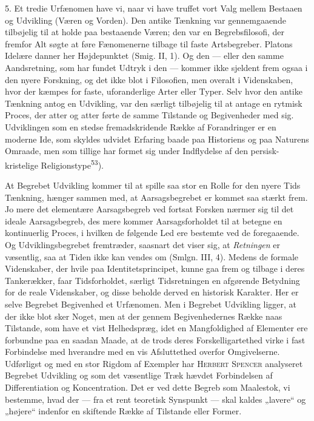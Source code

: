 \documentclass[12pt,a4paper,openany]{book}
\newcommand{\opage}[1]{\marginnote{\footnotesize\textit{[#1]}}}
\begin{document}
5. Et tredie Urfænomen have vi, naar vi have truffet vort Valg mellem Bestaaen
og Udvikling (Væren og Vorden). Den antike Tænkning var gennemgaaende
tilbøjelig til at holde paa bestaaende Væren; den var en Begrebsfilosofi, der
fremfor Alt søgte at føre Fænomenerne tilbage til faste Artsbegreber. Platons
Idelære danner her Højdepunktet (Smig. II, 1). Og den --- eller den samme
Aandsretning, som har fundet Udtryk i den --- kommer ikke sjeldent frem ogsaa i
den nyere Forskning, og det ikke blot i Filosofien, men overalt i Videnskaben,
hvor der kæmpes for faste, uforanderlige Arter eller Typer. Selv hvor den
antike Tænkning antog en Udvikling, var den særligt tilbøjelig til at antage en
rytmisk Proces, der atter og atter førte de samme Tilstande og Begivenheder med
sig. Udviklingen som en stedse fremadskridende Række af Forandringer er en
moderne Ide, som skyldes udvidet Erfaring baade paa Historiens
\opage{66}og paa Naturens Omraade, men som tillige har formet sig under
Indflydelse af den persisk-kristelige Religionstype\textsuperscript{53}).

At Begrebet Udvikling kommer til at spille saa stor en Rolle for den nyere Tids
Tænkning, hænger sammen med, at Aarsagsbegrebet er kommet saa stærkt frem. Jo
mere det elementære Aarsagsbegreb ved fortsat Forsken nærmer sig til det ideale
Aarsagsbegreb, des mere kommer Aarsagsforholdet til at betegne en kontinuerlig
Proces, i hvilken de følgende Led ere bestemte ved de foregaaende. Og
Udviklingsbegrebet fremtræder, saasnart det viser sig, at \textit{Retningen} er
væsentlig, saa at Tiden ikke kan vendes om (Smlgn. III, 4). Medens de formale
Videnskaber, der hvile paa Identitetsprincipet, kunne gaa frem og tilbage i
deres Tankerækker, faar Tidsforholdet, særligt Tidsretningen en afgørende
Betydning for de reale Videnskaber, og disse beholde derved en historisk
Karakter. Her er selve Begrebet Begivenhed et Urfænomen. Men i Begrebet
Udvikling ligger, at der ikke blot sker Noget, men at der gennem
Begivenhedernes Række naas Tilstande, som have et vist Helhedspræg, idet en
Mangfoldighed af Elementer ere forbundne paa en saadan Maade, at de trods deres
Forskelligartethed virke i fast Forbindelse med hverandre med en vis
Afsluttethed overfor Omgivelserne. Udførligst og med en stor Rigdom af Exempler
har \textsc{Herbert} \textsc{Spencer} analyseret Begrebet Udvikling og som det
væsentlige Træk hævdet Forbindelsen af Differentiation og Koncentration. Det er
ved dette Begreb som Maalestok, vi bestemme, hvad der --- fra et rent teoretisk
Synspunkt --- skal kaldes „lavere“ og „højere“ indenfor en skiftende Række af
Tilstande eller Former.
\end{document}
